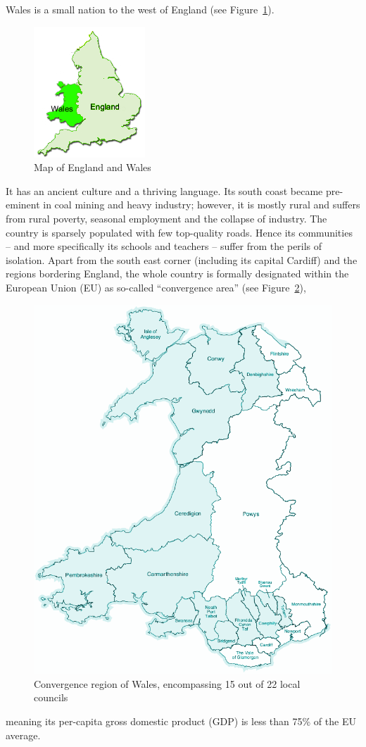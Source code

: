 \documentclass{sig-alternate}
\begin{document}

Wales is a small nation to the west of England (see Figure~\ref{fig:UK}).
\begin{figure}
  \centering
  \includegraphics[width=0.5\columnwidth]{images/UK.png}
  \caption{Map of England and Wales}
  \label{fig:UK}
\end{figure}
It has an ancient culture and a thriving language.
Its south coast became pre-eminent in coal mining and heavy industry;
however, it is mostly rural and suffers from rural poverty,
seasonal employment and the collapse of industry.
The country is sparsely populated with few top-quality roads.
Hence its communities
-- and more specifically its schools and teachers --
suffer from the perils of isolation.
Apart from the south east corner (including its capital Cardiff)
and the regions bordering England, the whole country is
formally designated within the European Union (EU) as so-called
``convergence area'' (see Figure~\ref{fig:wales}),
\begin{figure}
  \centering
  \includegraphics[width=0.5\columnwidth]{images/wales.png}
  \caption{Convergence region of Wales, encompassing 15 out of 22 local councils}
  \label{fig:wales}
\end{figure}
meaning its per-capita gross domestic product (GDP)
is less than 75\% of the EU average.
\end{document}

